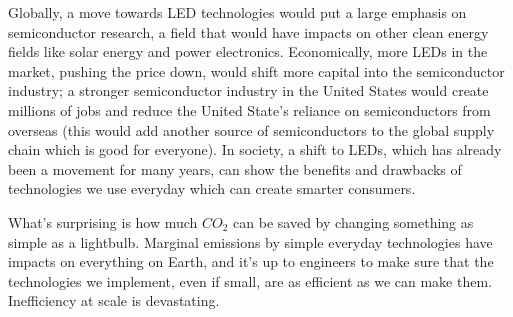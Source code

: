 \documentclass{article}
\begin{document}

Globally, a move towards LED technologies would put a large emphasis on semiconductor research, a field that would have impacts on other clean energy fields like solar energy and power electronics. Economically, more LEDs in the market, pushing the price down, would shift more capital into the semiconductor industry; a stronger semiconductor industry in the United States would create millions of jobs and reduce the United State's reliance on semiconductors from overseas (this would add another source of semiconductors to the global supply chain which is good for everyone). In society, a shift to LEDs, which has already been a movement for many years, can show the benefits and drawbacks of technologies we use everyday which can create smarter consumers. 


What's surprising is how much \(CO_2\) can be saved by changing something as simple as a lightbulb. Marginal emissions by simple everyday technologies have impacts on everything on Earth, and it's up to engineers to make sure that the technologies we implement, even if small, are as efficient as we can make them. Inefficiency at scale is devastating. 



\end{document}
